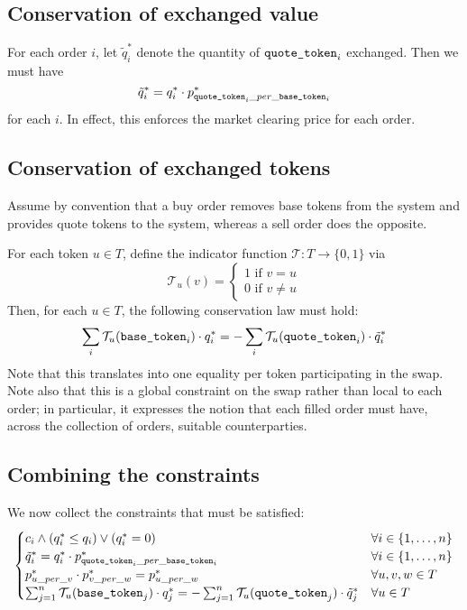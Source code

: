 \documentclass[11pt, reqno]{amsart}
\newcommand{\basetoken}{\textnormal{\texttt{base\_token}}}
\newcommand{\quotetoken}{\textnormal{\texttt{quote\_token}}}
\begin{document}
\subsection{Conservation of exchanged value}

For each order $i$, let $\tilde{q}_i^*$ denote the quantity of
$\quotetoken_i$ exchanged. Then we must have
\[
	\tilde{q}_i^* = q_i^* \cdot p_{\quotetoken_i\_per\_\basetoken_i}^*
\]
for each $i$. In effect, this enforces the market clearing price for each
order.

\subsection{Conservation of exchanged tokens}

Assume by convention that a buy order removes base tokens from the system and
provides quote tokens to the system, whereas a sell order does the opposite.

For each token $u \in T$, define the indicator function
$\mathcal{T}: T \to \{0, 1\}$ via
\[
	\mathcal{T}_u(v) =
	\begin{cases}
		1 \text{ if } v = u \\
		0 \text{ if } v \neq u
	\end{cases}
\]
Then, for each $u \in T$, the following conservation law must hold:
\[
	\sum_i \mathcal{T}_u(\basetoken_i) \cdot q^*_i
	=
	- \sum_i \mathcal{T}_u(\quotetoken_i) \cdot \tilde{q}_i^*
\]
Note that this translates into one equality per token participating in the
swap. Note also that this is a global constraint on the swap rather than local
to each order;
in particular, it expresses the notion that each filled order must have,
across the collection of orders, suitable counterparties.

\subsection{Combining the constraints}

We now collect the constraints that must be satisfied:
\begin{equation}
	\begin{cases}
		c_i \land (q_i^* \leq q_i) \lor (q_i^* = 0)
		 & \forall i \in \{1, \ldots, n\} \\
		\tilde{q}_i^* = q_i^* \cdot p_{\quotetoken_i\_per\_\basetoken_i}^*
		 & \forall i \in \{1, \ldots, n\} \\
		p^*_{u\_per\_v} \cdot p^*_{v\_per\_w} = p^*_{u\_per\_w}
		 & \forall u, v, w \in T          \\
		\sum_{j = 1}^n \mathcal{T}_u(\basetoken_j) \cdot q^*_j
		=
		- \sum_{j = 1}^n \mathcal{T}_u(\quotetoken_j) \cdot \tilde{q}_j^*
		 & \forall u \in T
	\end{cases}
\end{equation}
\end{document}
